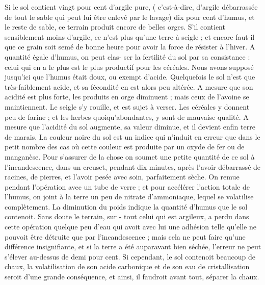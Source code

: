 Si le sol contient vingt pour cent d'argile pure, ( c'est-à-dire, d'argile débarrassée de tout le sable qui peut lui être enlevé par le lavage) dix pour cent d'humus, et le reste de sable, ce terrain produit encore de belles orges. S'il contient sensiblement moins d'argile, ce n'est plus qu'une terre à seigle ; et encore faut-il que ce grain soit semé de bonne heure pour avoir la force de résister à l'hiver.
A quantité égale d'humus, on peut clas-\setcounter{page}{106} ser la fertilité du sol par sa consistance : celui qui en a le plus est le plus productif pour les céréales.
Nous avons supposé jusqu'ici que l'humus était doux, ou exempt d'acide. Quelquefois le sol n'est que très-faiblement acide, et sa fécondité en est alors peu altérée. A mesure que son acidité est plus forte, les produits en orge diminuent ; mais ceux de l'avoine se maintiennent. Le seigle s'y rouille, et est sujet à verser. Les céréales y donnent peu de farine ; et les herbes quoiqu'abondantes, y sont de mauvaise qualité. A mesure que l'acidité du sol augmente, sa valeur diminue, et il devient enfin terre de marais.
La couleur noire du sol est un indice qui n'induit en erreur que dans le petit nombre des cas où cette couleur est produite par un oxyde de fer ou de manganèse. Pour s'assurer de la chose on soumet une petite quantité de ce sol à l'incandescence, dans un creuset, pendant dix minutes, après l'avoir débarrassé de racines, de pierres, et l'avoir pesée avec soin, parfaitement sèche. On remue pendant l'opération avec un tube de verre ; et pour accélérer l'action totale de l'humus, on joint à la terre un peu de nitrate d'ammoniaque, lequel se volatilise complètement.\setcounter{page}{107} La diminution du poids indique la quantité d'humus que le sol contenoit. Sans doute le terrain, sur - tout celui qui est argileux, a perdu dans cette opération quelque peu d'eau qui avoit avec lui une adhésion telle qu'elle ne pouvoit être détruite que par l'incandescence ; mais cela ne peut faire qu'une différence insignifiante, et si la terre a été auparavant bien séchée, l'erreur ne peut s'élever au-dessus de demi pour cent. Si cependant, le sol contenoit beaucoup de chaux, la volatilisation de son acide carbonique et de son eau de cristallisation seroit d'une grande conséquence, et ainsi, il faudroit avant tout, séparer la chaux.
